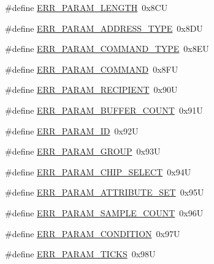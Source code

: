 \begin{DoxyCompactItemize}
\item 
\#define \hyperlink{group___p_e___error__module_ga14b3e7ce45de757b62ed57b6943e2172}{E\+R\+R\+\_\+\+P\+A\+R\+A\+M\+\_\+\+L\+E\+N\+G\+T\+H}~0x8\+C\+U
\item 
\#define \hyperlink{group___p_e___error__module_ga1c4b94765db3ec158123c398ed5da5b8}{E\+R\+R\+\_\+\+P\+A\+R\+A\+M\+\_\+\+A\+D\+D\+R\+E\+S\+S\+\_\+\+T\+Y\+P\+E}~0x8\+D\+U
\item 
\#define \hyperlink{group___p_e___error__module_gaa4b11a6a865c37326c099bc4f1d78b76}{E\+R\+R\+\_\+\+P\+A\+R\+A\+M\+\_\+\+C\+O\+M\+M\+A\+N\+D\+\_\+\+T\+Y\+P\+E}~0x8\+E\+U
\item 
\#define \hyperlink{group___p_e___error__module_gacedd3065faf570636ea5fb7774692682}{E\+R\+R\+\_\+\+P\+A\+R\+A\+M\+\_\+\+C\+O\+M\+M\+A\+N\+D}~0x8\+F\+U
\item 
\#define \hyperlink{group___p_e___error__module_gaead210c48411ddaef2b924a793ca2486}{E\+R\+R\+\_\+\+P\+A\+R\+A\+M\+\_\+\+R\+E\+C\+I\+P\+I\+E\+N\+T}~0x90\+U
\item 
\#define \hyperlink{group___p_e___error__module_gaa070f4244e26b8960766fab29f297fb8}{E\+R\+R\+\_\+\+P\+A\+R\+A\+M\+\_\+\+B\+U\+F\+F\+E\+R\+\_\+\+C\+O\+U\+N\+T}~0x91\+U
\item 
\#define \hyperlink{group___p_e___error__module_gae92766dcfa23207f4a9f6f5c9ee44b9c}{E\+R\+R\+\_\+\+P\+A\+R\+A\+M\+\_\+\+I\+D}~0x92\+U
\item 
\#define \hyperlink{group___p_e___error__module_ga01376cfa1506fab58b0ee14cb2a66285}{E\+R\+R\+\_\+\+P\+A\+R\+A\+M\+\_\+\+G\+R\+O\+U\+P}~0x93\+U
\item 
\#define \hyperlink{group___p_e___error__module_ga8c4e33d53312b200230a2640a8fdd524}{E\+R\+R\+\_\+\+P\+A\+R\+A\+M\+\_\+\+C\+H\+I\+P\+\_\+\+S\+E\+L\+E\+C\+T}~0x94\+U
\item 
\#define \hyperlink{group___p_e___error__module_ga23cb0d6ae40cae77d576f567521bd992}{E\+R\+R\+\_\+\+P\+A\+R\+A\+M\+\_\+\+A\+T\+T\+R\+I\+B\+U\+T\+E\+\_\+\+S\+E\+T}~0x95\+U
\item 
\#define \hyperlink{group___p_e___error__module_ga1285a1de60cce467f4d79bc73cd68af7}{E\+R\+R\+\_\+\+P\+A\+R\+A\+M\+\_\+\+S\+A\+M\+P\+L\+E\+\_\+\+C\+O\+U\+N\+T}~0x96\+U
\item 
\#define \hyperlink{group___p_e___error__module_gac616d07a0eba03bad3f1a78e11df56bf}{E\+R\+R\+\_\+\+P\+A\+R\+A\+M\+\_\+\+C\+O\+N\+D\+I\+T\+I\+O\+N}~0x97\+U
\item 
\#define \hyperlink{group___p_e___error__module_gafd38dd8d28af4d134dc8af4cadc4a59f}{E\+R\+R\+\_\+\+P\+A\+R\+A\+M\+\_\+\+T\+I\+C\+K\+S}~0x98\+U
\end{DoxyCompactItemize}


